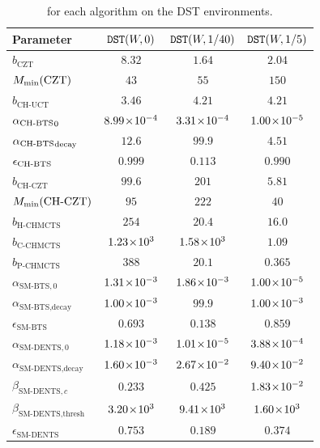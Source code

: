     \begin{table}[tbp]
        \centering
        \begin{tabular}{l|c|c|c}
            Parameter
                & ${\textnormal{\texttt{DST}}}(W,0)$
                & ${\textnormal{\texttt{DST}}}(W,1/40)$
                & ${\textnormal{\texttt{DST}}}(W,1/5)$   \\
            \hline
            $b_{\text{CZT}}$ & $8.32$ & $1.64$ & $2.04$ \\
            $M_{\textnormal{min}} (\text{CZT})$ & $43$ & $55$ & $150$ \\

            $b_{\text{CH-UCT}}$ & $3.46$ & $4.21$ & $4.21$ \\

            ${\alpha_{{\textnormal{CH-BTS}}}}_{0}$ & $8.99\!\times\!10^{-4}$ & $3.31\!\times\!10^{-4}$ & $1.00\!\times\!10^{-5}$ \\
            ${\alpha_{{\textnormal{CH-BTS}}}}_{\text{decay}}$ & $12.6$ & $99.9$ & $4.51$ \\
            ${\epsilon_{{\textnormal{CH-BTS}}}}$ & $0.999$ & $0.113$ & $0.990$ \\

            $b_{\text{CH-CZT}}$ & $99.6$ & $201$ & $5.81$ \\
            $M_{\textnormal{min}}(\text{CH-CZT})$ & $95$ & $222$ & $40$ \\

            $b_{\text{H-CHMCTS}}$ & $254$ & $20.4$ & $16.0$ \\
            $b_{\text{C-CHMCTS}}$ & $1.23\!\times\!10^{3}$ & $1.58\!\times\!10^{3}$ & $1.09$ \\
            $b_{\text{P-CHMCTS}}$ & $388$ & $20.1$ & $0.365$ \\

            $\alpha_{\text{SM-BTS},0}$ & $1.31\!\times\!10^{-3}$ & $1.86\!\times\!10^{-3}$ & $1.00\!\times\!10^{-5}$ \\
            $\alpha_{\text{SM-BTS},\text{decay}}$ & $1.00\!\times\!10^{-3}$ & $99.9$ & $1.00\!\times\!10^{-3}$ \\
            $\epsilon_{\text{SM-BTS}}$ & $0.693$ & $0.138$ & $0.859$ \\

            $\alpha_{\text{SM-DENTS},0}$ & $1.18\!\times\!10^{-3}$ & $1.01\!\times\!10^{-5}$ & $3.88\!\times\!10^{-4}$ \\
            $\alpha_{\text{SM-DENTS},\text{decay}}$ & $1.60\!\times\!10^{-3}$ & $2.67\!\times\!10^{-2}$ & $9.40\!\times\!10^{-2}$ \\
            $\beta_{\text{SM-DENTS},c}$ & $0.233$ & $0.425$ & $1.83\!\times\!10^{-2}$ \\
            $\beta_{\text{SM-DENTS},\text{thresh}}$ & $3.20\!\times\!10^{3}$ & $9.41\!\times\!10^{3}$ & $1.60\!\times\!10^{3}$ \\
            $\epsilon_{\text{SM-DENTS}}$ & $0.753$ & $0.189$ & $0.374$
        \end{tabular}
        \caption[ for DST environments.]{ for each algorithm on the DST environments.}
        \label{table:hyperparams_dst}
    \end{table}








